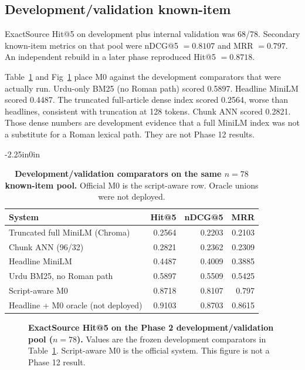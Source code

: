 \documentclass[10pt,letterpaper]{article}
\begin{document}
\subsection*{Development/validation known-item}

ExactSource Hit@5 on development plus internal validation was 68/78. Secondary known-item metrics on that pool were nDCG@5 $= 0.8107$ and MRR $= 0.797$. An independent rebuild in a later phase reproduced Hit@5 $= 0.8718$.

Table~\ref{table2} and Fig~\ref{fig2} place M0 against the development comparators that were actually run. Urdu-only BM25 (no Roman path) scored 0.5897. Headline MiniLM scored 0.4487. The truncated full-article dense index scored 0.2564, worse than headlines, consistent with truncation at 128 tokens. Chunk ANN scored 0.2821. Those dense numbers are development evidence that a full MiniLM index was not a substitute for a Roman lexical path. They are not Phase 12 results.

\begin{adjustwidth}{-2.25in}{0in}
\begin{table}[!ht]
\centering
\caption{\textbf{Development/validation comparators on the same $n = 78$ known-item pool.} Official M0 is the script-aware row. Oracle unions were not deployed.}
\begin{tabular}{|l|r|r|r|}
\hline
\textbf{System} & \textbf{Hit@5} & \textbf{nDCG@5} & \textbf{MRR} \\
\hline
Truncated full MiniLM (Chroma) & 0.2564 & 0.2203 & 0.2103 \\
\hline
Chunk ANN (96/32) & 0.2821 & 0.2362 & 0.2309 \\
\hline
Headline MiniLM & 0.4487 & 0.4009 & 0.3885 \\
\hline
Urdu BM25, no Roman path & 0.5897 & 0.5509 & 0.5425 \\
\hline
Script-aware M0 & 0.8718 & 0.8107 & 0.797 \\
\hline
Headline + M0 oracle (not deployed) & 0.9103 & 0.8703 & 0.8615 \\
\hline
\end{tabular}
\label{table2}
\end{table}
\end{adjustwidth}

\begin{figure}[!h]
\caption{\textbf{ExactSource Hit@5 on the Phase 2 development/validation pool ($n = 78$).} Values are the frozen development comparators in Table~\ref{table2}. Script-aware M0 is the official system. This figure is not a Phase 12 result.}
\label{fig2}
\end{figure}
\end{document}
